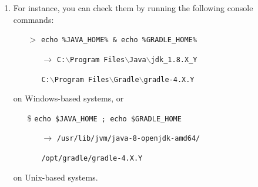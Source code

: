 \documentclass[handout]{beamer}\mode<presentation>{\usetheme{AMSCesenaBleu}}
\begin{document}
\begin{frame}[allowframebreaks]
\begin{enumerate}
    \vspace{.5cm}
    
    \item For instance, you can check them by running the following console commands:
    \begin{itemize}
        \item[$>$] \texttt{echo \alert{\%}JAVA\_HOME\alert{\%} \& echo \alert{\%}GRADLE\_HOME\alert{\%}}
        \begin{itemize}
            \item[$\rightarrow$] \texttt{C:$\backslash$Program Files$\backslash$Java$\backslash$jdk\_1.8.X\_Y} 
            \item[] \texttt{C:$\backslash$Program Files$\backslash$Gradle$\backslash$gradle-4.X.Y} 
        \end{itemize}
    \end{itemize}
    on Windows-based systems, or
    \begin{itemize}
        \item[\$] \texttt{echo \alert{\$}JAVA\_HOME ; echo \alert{\$}GRADLE\_HOME}
        \begin{itemize}
            \item[$\rightarrow$] \texttt{/usr/lib/jvm/java-8-openjdk-amd64/}
            \item[] \texttt{/opt/gradle/gradle-4.X.Y}
        \end{itemize}
    \end{itemize}
    on Unix-based systems.
    
   \framebreak
    

\end{enumerate}
\end{frame}
\end{document}
